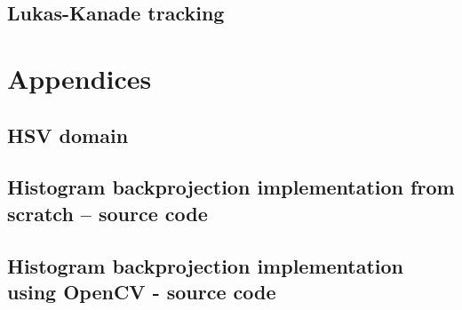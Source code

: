 \documentclass[a4paper]{article}
\begin{document}
\subsection{Lukas-Kanade tracking}





\newpage
\appendix

\section{Appendices}

\newpage
\subsection{HSV domain}
\label{app:hsv_domain}






\newpage


\subsection{Histogram backprojection implementation from scratch -- source code}
\label{app:hist_backproj_src}




\newpage
\subsection{Histogram backprojection implementation using OpenCV - source code}
\label{app:hist_backproj_src_opencv}



\newpage
\end{document}
